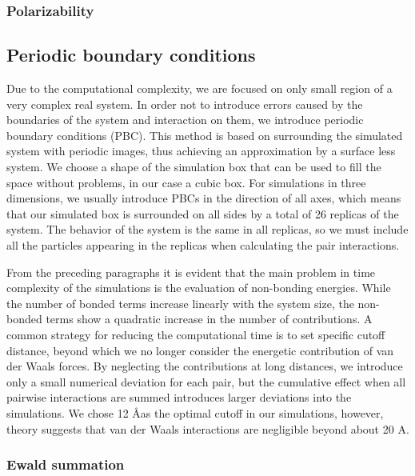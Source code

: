 \subsubsection{Polarizability}



\subsection{Periodic boundary conditions}
Due to the computational complexity, we are focused on only small region of a very complex real system.  In order not to introduce errors caused by the boundaries of the system and interaction on them, we introduce periodic boundary conditions (PBC). This method is based on surrounding the simulated system with periodic images, thus achieving an approximation by a surface less system. We choose a shape of the simulation box that can be used to fill the space without problems, in our case a cubic box. For simulations in three dimensions, we usually introduce PBCs in the direction of all axes, which means that our simulated box is surrounded on all sides by a total of 26 replicas of the system. The behavior of the system is the same in all replicas, so we must include all the particles appearing in the replicas when calculating the pair interactions. 

%
From the preceding paragraphs it is evident that the main problem in time complexity of the simulations is the evaluation of non-bonding energies. While the number of bonded terms increase linearly with the system size, the non-bonded terms show a quadratic increase in the number of contributions. A common strategy for reducing the computational time is to set specific cutoff distance, beyond which we no longer consider the energetic contribution of van der Waals forces. By neglecting the contributions at long distances, we introduce only a small numerical deviation for each pair, but the cumulative effect when all pairwise interactions are summed introduces larger deviations into the simulations. We chose 12 \AA as the optimal cutoff in our simulations, however, theory suggests that van der Waals interactions are negligible beyond about 20 A. 

\subsubsection{Ewald summation}
